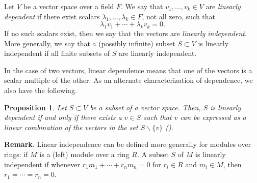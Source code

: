 \documentclass{article}
\newtheorem{proposition}{Proposition}
\begin{document}
Let $V$ be a vector space over a
field $F$. We say that $v_1,\ldots, v_k\in V$ are \emph{linearly dependent} if there exist scalars $\lambda_1,\ldots, \lambda_k\in F$, not all zero, such that
\[
\lambda_1 v_1+  \cdots  +\lambda_k v_k = 0 .
\]
If no such scalars exist, then we say that the vectors are \emph{linearly independent}. 
More generally, we say that a (possibly infinite) subset $S\subset V$ is linearly independent if all finite subsets of $S$ are linearly independent.

In the case of two vectors, linear dependence means that one of the
vectors is a scalar multiple of the other.  As an alternate
characterization of dependence, we also have the following.
\begin{proposition}
  Let $S\subset V$ be a subset of a vector space.  Then, $S$ is
  linearly dependent if and only if there exists a $v\in S$ such that
  $v$ can be expressed as a linear combination of the vectors in the
  set $S\backslash \{v\}$ ().
\end{proposition}

\textbf{Remark}.  Linear independence can be defined more generally for modules over rings: if $M$ is a (left) module over a ring $R$.  A subset $S$ of $M$ is linearly independent if whenever $r_1m_1+\cdots +r_nm_n=0$ for $r_i\in R$ and $m_i\in M$, then $r_1=\cdots =r_n=0$.
\end{document}
